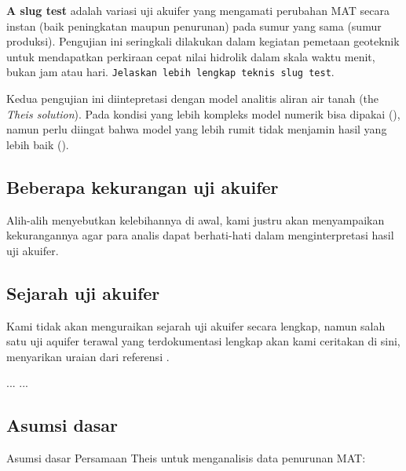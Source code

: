 \textbf{A slug test} adalah variasi uji akuifer yang mengamati perubahan MAT secara instan (baik peningkatan maupun penurunan) pada sumur yang sama (sumur produksi). Pengujian ini seringkali dilakukan dalam kegiatan pemetaan geoteknik untuk mendapatkan perkiraan cepat nilai hidrolik dalam skala waktu menit, bukan jam atau hari. \verb|Jelaskan lebih lengkap teknis slug test|.

Kedua pengujian ini diintepretasi dengan model analitis  aliran air tanah (the \textit{Theis solution}). Pada kondisi yang lebih kompleks model numerik bisa dipakai (\cite{lebbe1995validation}), namun perlu diingat bahwa model yang lebih rumit tidak menjamin hasil yang lebih baik (\cite{Johnson_2001}\cite{Rushton_1976}\cite{Rathod_1984}\cite{2011}\cite{Lebbe_1999}\cite{Lebbe_1999}). 

\subsection{Beberapa kekurangan uji akuifer}

Alih-alih menyebutkan kelebihannya di awal, kami justru akan menyampaikan kekurangannya agar para analis dapat berhati-hati dalam menginterpretasi hasil uji akuifer.



\subsection{Sejarah uji akuifer}

Kami tidak akan menguraikan sejarah uji akuifer secara lengkap, namun salah satu uji aquifer terawal yang terdokumentasi lengkap akan kami ceritakan di sini, menyarikan uraian dari referensi \cite{kruseman1994analysis}.

...
...




\subsection{Asumsi dasar}

Asumsi dasar Persamaan Theis untuk menganalisis data penurunan MAT:

